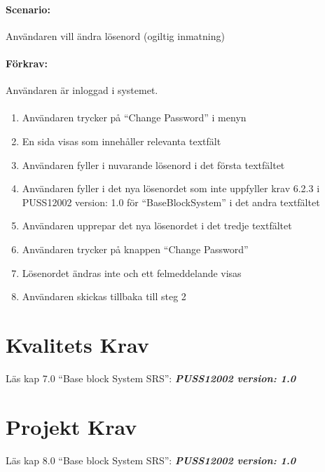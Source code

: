 \documentclass[paper=a4, fontsize=11pt,twoside]{article}
\begin{document}
	\paragraph{Scenario:}Användaren vill ändra lösenord (ogiltig inmatning)
	\paragraph{Förkrav:}
	Användaren är inloggad i systemet.
	\paragraph{}
	\begin{enumerate}
		\item  Användaren trycker på “Change Password” i menyn
		\item	 En sida visas som innehåller relevanta textfält
		\item	Användaren fyller i nuvarande lösenord i det första textfältet
		\item	Användaren fyller i det nya lösenordet som inte uppfyller krav 6.2.3 i PUSS12002 version: 1.0 för “BaseBlockSystem” i det andra textfältet
		\item	Användaren upprepar det nya lösenordet i det tredje textfältet
		\item	Användaren trycker på knappen “Change Password”
		\item	Lösenordet ändras inte och ett felmeddelande visas
		\item Användaren skickas tillbaka till steg 2
		
	\end{enumerate}
	\newpage
	\section{Kvalitets Krav}
	Läs kap 7.0  “Base block System SRS”:   \textbf{\textit{PUSS12002 version: 1.0}} 
	\section{Projekt Krav}
	Läs kap 8.0  “Base block System SRS”:   \textbf{\textit{PUSS12002 version: 1.0}} 
\end{document}
